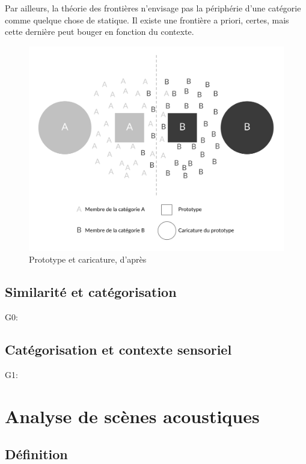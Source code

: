 Par ailleurs, la théorie des frontières n'envisage pas la périphérie d'une catégorie comme quelque chose de statique. Il existe une frontière a priori, certes, mais cette dernière peut bouger en fonction du contexte.

\begin{figure}[t]
        \myfloatalign
        \includegraphics[width=.8\linewidth]{gfx/prototypeCaricature}
        \caption[Prototype et caricature]{Prototype et caricature, d'après \citep{davis2010memory}}\label{fig:prototypeCaricature}
\end{figure}

\subsection{Similarité et catégorisation}

G0: \citep{gygi2007similarity}

\subsection{Catégorisation et contexte sensoriel}
\label{sec:ch3_identification et Contexte}

G1: \citep{ballas1987interpreting,niessen2008disambiguating,gygi2011incongruency} \\


\section{Analyse de scènes acoustiques}
\label{sec:ch3_ASA}

\subsection{Définition}
\label{sec:ASAintro}


